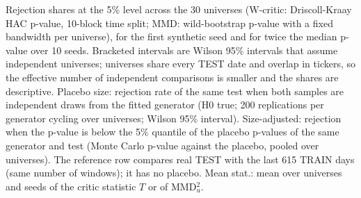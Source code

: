 Rejection shares at the 5\% level across the 30 universes (W-critic: Driscoll-Kraay HAC p-value, 10-block time split; MMD: wild-bootstrap p-value with a fixed bandwidth per universe), for the first synthetic seed and for twice the median p-value over 10 seeds. Bracketed intervals are Wilson 95\% intervals that assume independent universes; universes share every TEST date and overlap in tickers, so the effective number of independent comparisons is smaller and the shares are descriptive. Placebo size: rejection rate of the same test when both samples are independent draws from the fitted generator (H0 true; 200 replications per generator cycling over universes; Wilson 95\% interval). Size-adjusted: rejection when the p-value is below the 5\% quantile of the placebo p-values of the same generator and test (Monte Carlo p-value against the placebo, pooled over universes). The reference row compares real TEST with the last 615 TRAIN days (same number of windows); it has no placebo. Mean stat.: mean over universes and seeds of the critic statistic $T$ or of MMD$^2_u$.
